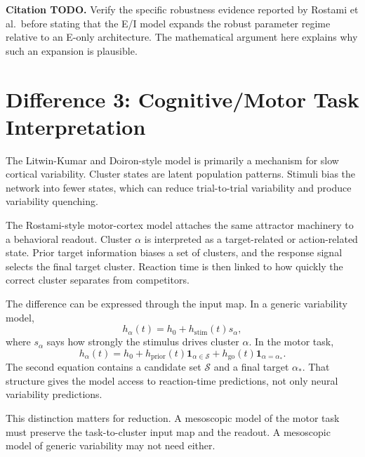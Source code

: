 \noindent\textbf{Citation TODO.} Verify the specific robustness evidence reported by Rostami et al.\ before stating that the E/I model expands the robust parameter regime relative to an E-only architecture. The mathematical argument here explains why such an expansion is plausible.

\section{Difference 3: Cognitive/Motor Task Interpretation}
\label{sec:difference-cognitive-motor-task-interpretation}

The Litwin-Kumar and Doiron-style model is primarily a mechanism for slow cortical variability. Cluster states are latent population patterns. Stimuli bias the network into fewer states, which can reduce trial-to-trial variability and produce variability quenching.

The Rostami-style motor-cortex model attaches the same attractor machinery to a behavioral readout. Cluster $\alpha$ is interpreted as a target-related or action-related state. Prior target information biases a set of clusters, and the response signal selects the final target cluster. Reaction time is then linked to how quickly the correct cluster separates from competitors.

The difference can be expressed through the input map. In a generic variability model,
%
\begin{equation}
  h_{\alpha}(t)
  =
  h_0 + h_{\mathrm{stim}}(t)s_{\alpha},
  \label{eq:generic-stimulus-bias-ch14}
\end{equation}
%
where $s_{\alpha}$ says how strongly the stimulus drives cluster $\alpha$. In the motor task,
%
\begin{equation}
  h_{\alpha}(t)
  =
  h_0
  +
  h_{\mathrm{prior}}(t)\mathbf{1}_{\alpha\in\mathcal{S}}
  +
  h_{\mathrm{go}}(t)\mathbf{1}_{\alpha=\alpha_*}.
  \label{eq:motor-task-bias-ch14}
\end{equation}
%
The second equation contains a candidate set $\mathcal{S}$ and a final target $\alpha_*$. That structure gives the model access to reaction-time predictions, not only neural variability predictions.

This distinction matters for reduction. A mesoscopic model of the motor task must preserve the task-to-cluster input map and the readout. A mesoscopic model of generic variability may not need either.


